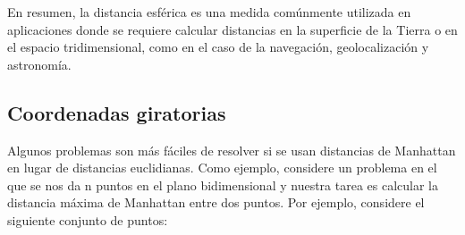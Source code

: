 En resumen, la distancia esférica es una medida comúnmente utilizada en aplicaciones donde se requiere calcular distancias en la superficie de la Tierra o en el espacio tridimensional, como en el caso de la navegación, geolocalización y astronomía.

\subsection{Coordenadas giratorias}

Algunos problemas son más fáciles de resolver si se usan distancias de Manhattan en lugar de distancias euclidianas. Como ejemplo, considere un problema en el que se nos da n puntos en el plano bidimensional y nuestra tarea es calcular la distancia máxima de Manhattan entre dos puntos. Por ejemplo, considere el siguiente conjunto de puntos:
